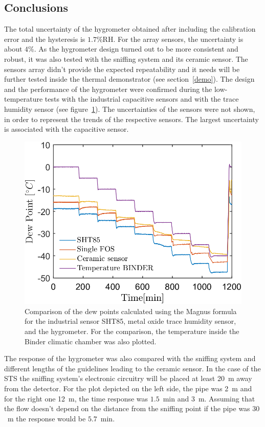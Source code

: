 \subsection{Conclusions}
The total uncertainty of the hygrometer obtained after including the calibration error and the hysteresis is $1.7$\%RH. For the array sensors, the uncertainty is about $4\%$.
As the hygrometer design turned out to be more consistent and robust, it was also tested with the sniffing system and its ceramic sensor. The sensors array didn't provide the expected repeatability and it needs will be further tested inside the thermal demonstrator (see section~\ref{demo}). The design and the performance of the hygrometer were confirmed during the low-temperature tests with the industrial capacitive sensors and with the trace humidity sensor (see figure~\ref{fig_comparison}). The uncertainties of the sensors were not shown, in order to represent the trends of the respective sensors. The largest uncertainty is associated with the capacitive sensor. 
\begin{figure}[!h]
\centering
\includegraphics[width=0.6\columnwidth]{Chapter5/images/DPCPercent.png}
\caption{Comparison of the dew points calculated using the Magnus formula for the industrial sensor SHT85, metal oxide trace humidity sensor, and the hygrometer. For the comparison, the temperature inside the Binder climatic chamber was also plotted.}
\label{fig_comparison}
\end{figure}
The response of the hygrometer was also compared with the sniffing system and different lengths of the guidelines leading to the ceramic sensor. In the case of the \gls{STS} the sniffing system's electronic circuitry will be placed at least \SI{20}{\metre} away from the detector. For the plot depicted on the left side, the pipe was \SI{2}{\metre} and for the right one \SI{12}{\metre}, the time response was $1.5$~min and $3$~m. Assuming that the flow doesn't depend on the distance from the sniffing point if the pipe was $30$~m the response would be $5.7$~min. 
